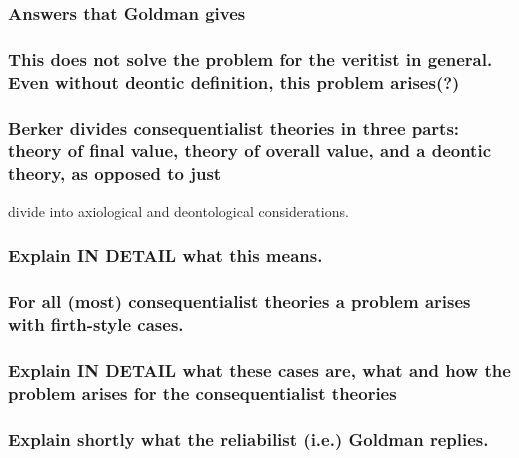 \documentclass[12pt,numbers=noenddot]{scrartcl}
\begin{document}
\subsubsection{ Answers that Goldman gives}
\subsubsection{ This does not solve the problem for the veritist in general. Even without deontic definition, this problem arises(?)}
\subsubsection{ Berker divides consequentialist theories in three parts: theory of final value, theory of overall value, and a deontic theory, as opposed to just }divide into axiological and deontological considerations. 
\subsubsection{ Explain IN DETAIL what this means. }
\subsubsection{ For all (most) consequentialist theories a problem arises with firth-style cases. }
\subsubsection{ Explain IN DETAIL what these cases are, what and how the problem arises for the consequentialist theories}
\subsubsection{ Explain shortly what the reliabilist (i.e.) Goldman replies.  }
\end{document}
